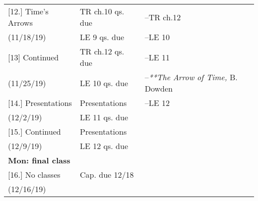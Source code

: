 \documentclass[article,oneside]{memoir}
\begin{document}
\begin{center}
\begin{longtable}{p{4.5cm}p{2.5cm}p{5cm}}


[12.] Time's Arrows			& TR ch.10 qs. due		& --TR ch.12 \\
(11/18/19)		 			& LE 9 qs. due	    	&  --LE 10 \\ [1.8\baselineskip]


[13] Continued			 	& TR ch.12 qs. due	& --LE 11\\
(11/25/19)					&  LE 10 qs. due	 &--\emph{**The Arrow of Time,} B. Dowden \\ [1.8\baselineskip]




				


[14.] Presentations 		& Presentations 			&    --LE 12 \\
(12/2/19)				       &   LE 11 qs. due	   	&  \\ [1.8\baselineskip]

						
[15.] 	Continued     			& 		Presentations	&   \\
(12/9/19)				      	& 	LE 12 qs. due		 &  \\ 
\textbf{Mon: final class}		&			&  \\ [1.8\baselineskip]

[16.] 	No classes	 	      		&  Cap. due 12/18				&   \\
(12/16/19)				      	&			      	&  \\  [1.8\baselineskip]



\end{longtable}
\end{center}





\end{document}
